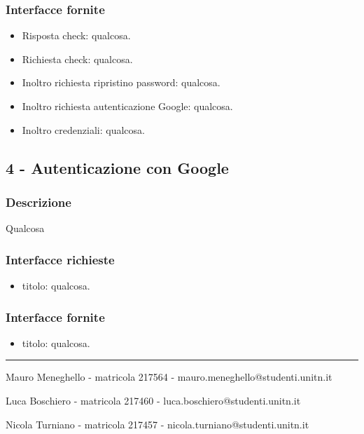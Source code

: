 \documentclass[a4paper,12pt]{article}
\begin{document}
\subsubsection*{Interfacce fornite}
\begin{itemize} \setlength\itemsep{0.01em}
\item {\sffamily Risposta check}: qualcosa.
\item {\sffamily Richiesta check}: qualcosa.
\item {\sffamily Inoltro richiesta ripristino password}: qualcosa.
\item {\sffamily Inoltro richiesta autenticazione Google}: qualcosa.
\item {\sffamily Inoltro credenziali}: qualcosa.

\end{itemize}

\subsection*{4 -  Autenticazione con Google}
\subsubsection*{Descrizione}
Qualcosa
\subsubsection*{Interfacce richieste}
\begin{itemize} \setlength\itemsep{0.01em}
\item {\sffamily titolo}: qualcosa.
\end{itemize}

\subsubsection*{Interfacce fornite}
\begin{itemize} \setlength\itemsep{0.01em}
\item {\sffamily titolo}: qualcosa.
\end{itemize}









\vspace{15cm}
\hrule
\vspace{0.5cm}


Mauro Meneghello - matricola 217564 - mauro.meneghello@studenti.unitn.it

Luca Boschiero - matricola 217460 -  luca.boschiero@studenti.unitn.it

Nicola Turniano - matricola 217457 - nicola.turniano@studenti.unitn.it

 
\end{document}
